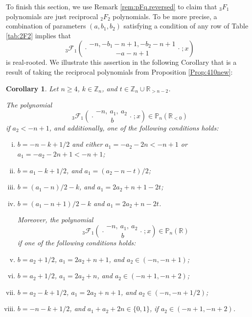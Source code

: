 \documentclass[reqno,11pt]{amsart}
\newtheorem{corollary}[theorem]{Corollary}
\theoremstyle{remark}
\renewcommand{\P}{\mathbb{P}}
\newcommand{\R}{\mathbb{R}}
\newcommand{\Z}{\mathbb{Z}}
\newcommand{\rr}{\mathbb{R}}
\newcommand*\pFq[5]{%
 {\ }_{#1}{\mathcal F}_{#2}{\left(\genfrac..{0pt}{}{#3}{#4};#5\right)}%
}
\begin{document}
To finish this section, we use Remark \ref{rem:pFq.reversed} to claim that ${}_3 F_1$ polynomials are just reciprocal ${}_2 F_2$ polynomials. To be more precise, a combination of parameters $(a, b_1, b_2)$ satisfying a condition of any row of Table \ref{tab:2F2} implies that 
\begin{equation}
    \label{reversed3F1}
    \pFq{3}{1}{-n, -  b_1-n+1,- b_2-n+1}{-  a-n+1}{x}
\end{equation}
is real-rooted. We illustrate this assertion in the following Corollary that is a result of taking the reciprocal polynomials from Proposition \ref{Prop:410new}:
\begin{corollary} 
\label{Cor:414new}
Let $n\ge 4$, $k \in \Z_n$, and $t\in \Z_n \cup\rr_{>n-2}$.

The polynomial
\begin{equation*}
    \pFq{3}{1}{-n,\ a_1,\ a_2}{\ b}{x} \in \P_n(\R_{<0})
\end{equation*}
if $a_2<-n+1$, and additionally, one of the following conditions holds:
\begin{enumerate}[(i)]
  \item  
   $ b=-n -k +1/2$ and
   either $a_1=-a_2-2n<-n+1$ or $a_1=-a_2-2n+1<-n+1$;

 \item  
    $ b= a_1 - k +1/2$, and 
    $a_1= (a_2-n-t)/2$;

 \item 
   $ b= (a_1-n)/2-k  $, and $a_1=2a_2+n+1-2t$;

\item  
   $ b= (a_1-n+1)/2-k$ and $a_1=2a_2+n -2t $.

\vspace{.2cm}

\hspace{-1.3cm} Moreover, the polynomial 
\begin{equation*}
    \pFq{3}{1}{-n,\ a_1,\ a_2}{\ b}{x} \in \P_n(\R )
\end{equation*}
if one of the following conditions holds:

\vspace{.2cm}

    \item  
    $ b= a_2+1/2 $,   
$a_1 = 2a_2+n +1$, and $a_2\in (-n ,-n+1) $;

   \item  
   $ b= a_2+1/2 $, $a_1 = 2a_2+n $, and $a_2\in (-n+1,-n+2) $;
   
  \item  
    $ b= a_2 - k +1/2$,  
$a_1 = 2a_2+n  +1$, and $a_2\in (-n,-n+1/2)$;

 \item  
   $ b=-n -k +1/2$, and $a_1+a_2+2n\in \{0, 1\}$, if $a_2\in (-n+1,-n+2)$.
\end{enumerate} 
\end{corollary}
\end{document}

